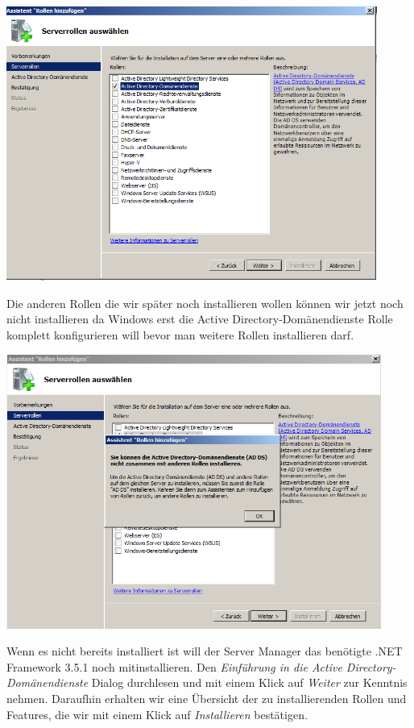 \documentclass[12pt,a4paper,titlepage]{scrartcl} %
\begin{document}
	\begin{center}\includegraphics[height=9cm]{Bilder/008}\\ \end{center}
	
Die anderen Rollen die wir später noch installieren wollen können wir jetzt noch nicht installieren da Windows erst die Active Directory-Domänendienste Rolle komplett konfigurieren will bevor man weitere Rollen installieren darf.\\
 
 	\begin{center}\includegraphics[height=9cm]{Bilder/009}\\ \end{center}
 	
Wenn es nicht bereits installiert ist will der Server Manager das benötigte .NET Framework 3.5.1 noch mitinstallieren. Den \emph{Einführung in die Active Directory-Domänendienste} Dialog durchlesen und mit einem Klick auf \emph{Weiter} zur Kenntnis nehmen. Daraufhin erhalten wir eine Übersicht der zu installierenden Rollen und Features, die wir mit einem Klick auf \emph{Installieren} bestätigen.\\
\end{document}
